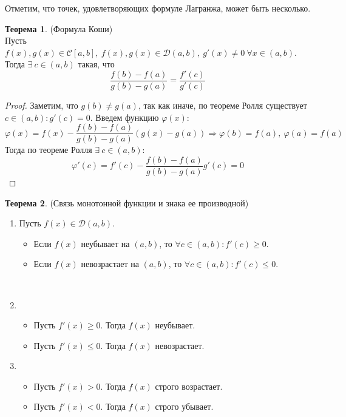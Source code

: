 \documentclass[a4paper, 12pt]{article}
\renewcommand{\phi}{\varphi}
\newcommand\tab[1][.5cm]{\hspace*{#1}}
\theoremstyle{definition}
\newtheorem*{theorem}{Теорема}
\begin{document}
        Отметим, что точек, удовлетворяющих формуле Лагранжа, может быть несколько.
        \begin{theorem} (Формула Коши)\\
            Пусть $f(x),g(x)\in \mathcal{C}[a,b],\ f(x),g(x) \in \mathcal{D}(a,b),\ g'(x)\ne 0\ \forall x\in (a,b)$. Тогда $\exists\ c\in (a,b)$ такая, что
            \[\frac{f(b)-f(a)}{g(b)-g(a)}=\frac{f'(c)}{g'(c)}\]
        \end{theorem} 
        \begin{proof}
            Заметим, что $g(b)\ne g(a)$, так как иначе, по теореме Ролля существует $c\in (a,b): g'(c)=0$. Введем функцию $\phi(x):$
            \[\phi(x)=f(x)-\frac{f(b)-f(a)}{g(b)-g(a)}(g(x)-g(a)) \Rightarrow \phi(b)=f(a),\ \phi(a)=f(a)\]
            Тогда по теореме Ролля $\exists\ c\in (a,b):$
            \[\phi'(c)=f'(c)-\frac{f(b)-f(a)}{g(b)-g(a)}g'(c)=0\]
        \end{proof} 
        \begin{theorem} (Связь монотонной функции и знака ее производной)\tab
            \begin{enumerate}
                \item Пусть $f(x)\in \mathcal{D}(a,b)$.
                    \begin{itemize}
                        \item Если $f(x)$ неубывает на $(a,b)$, то $\forall c\in (a,b): f'(c)\geq 0$.
                        \item Если $f(x)$ невозрастает на $(a,b)$, то $\forall c\in (a,b): f'(c)\leq 0$.
                    \end{itemize}\
                \item
                    \begin{itemize}
                        \item Пусть $f'(x)\geq 0$. Тогда $f(x)$ неубывает.
                        \item Пусть $f'(x)\leq 0$. Тогда $f(x)$ невозрастает.
                    \end{itemize}
                \item 
                    \begin{itemize}
                        \item Пусть $f'(x)>0$. Тогда $f(x)$ строго возрастает.
                        \item Пусть $f'(x)<0$. Тогда $f(x)$ строго убывает.
                    \end{itemize}
            \end{enumerate}
        \end{theorem} 
\end{document}
